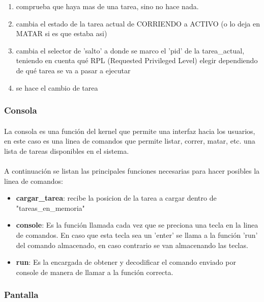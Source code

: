 \documentclass[11pt, a4paper]{article}
\begin{document}
\begin{enumerate}
\item comprueba que haya mas de una tarea, sino no hace nada.
\item cambia el estado de la tarea actual de CORRIENDO a ACTIVO (o lo deja en MATAR si es que estaba asi)
\item cambia el selector de 'salto' a donde se marco el 'pid' de la tarea\_actual, teniendo en cuenta qué RPL (Requested Privileged Level) elegir dependiendo de qué tarea se va a pasar a ejecutar
\item se hace el cambio de tarea
\end{enumerate}

\subsubsection{Consola}

\paragraph{}
La consola es una función del kernel que permite una interfaz hacia los usuarios, en este caso es una linea de comandos que permite listar, correr, matar, etc. una lista de tareas disponibles en el sistema. 
\paragraph{}
A continuación se listan las principales funciones necesarias para hacer posibles la linea de comandos:
\begin{itemize}

\item \textbf{ cargar\_tarea}: recibe la posicion de la tarea a cargar dentro de "tareas\_en\_memoria"

\item \textbf{console}: Es la función llamada cada vez que se preciona una tecla en la linea de comandos. En caso que esta tecla sea un 'enter' se llama a la función 'run' del comando almacenado, en caso contrario se van almacenando las teclas.
\item \textbf{run}: Es la encargada de obtener y decodificar el comando enviado por console de manera de llamar a la función correcta.
\end{itemize}				



\subsubsection{Pantalla}
\end{document}
